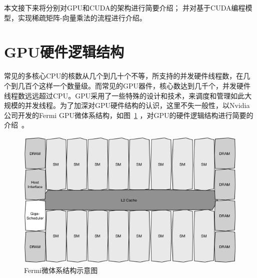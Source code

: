 \documentclass[11pt,twocolumn]{article}
\begin{document}
本文接下来将分别对GPU和CUDA的架构进行简要介绍；
并对基于CUDA编程模型，实现稀疏矩阵-向量乘法的流程进行介绍。

\renewcommand{\figurename}{图}
\section{GPU硬件逻辑结构}
常见的多核心CPU的核数从几个到几十个不等，所支持的并发硬件线程数，在几个到几百个这样一个数量级。而常见的GPU器件，核心数达到几千个，并发硬件线程数远远超过CPU。GPU采用了一些特殊的设计和技术，来调度和管理如此大规模的并发线程。为了加深对GPU硬件结构的认识，这里不失一般性，以Nvidia公司开发的Fermi GPU微体系结构，如图~\ref{fig:fermi} ，对GPU的硬件逻辑结构进行简要的介绍~\cite{Fermi}。
\begin{figure}
  \centering
    \includegraphics[scale=0.36]{images/hw-layout.png}
  \caption{Fermi微体系结构示意图}
  \label{fig:fermi}
\end{figure}
\end{document}
